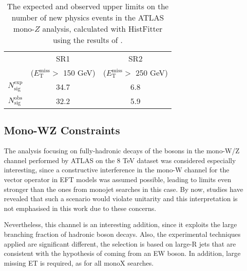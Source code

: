 \begin{table}
\begin{center}
\begin{tabular}{ c  c  c }
\hline
\hline
& SR1 & SR2 \T \\
& ($E_{\mathrm{T}}^{\mathrm{miss}} > $ 150 GeV) & ($E_{\mathrm{T}}^{\mathrm{miss}} > $ 250 GeV) \B \\
\hline
$N_{\mathrm{sig}}^{\mathrm{exp}}$ & 34.7 & 6.8 \T \\
$N_{\mathrm{sig}}^{\mathrm{obs}}$ & 32.2 & 5.9 \B \\
\hline
\hline
\end{tabular}
\end{center}
\label{tab:Nlim_monoZ}
\caption{The expected and observed upper limits on the number of new physics events in the ATLAS mono-$Z$ analysis, calculated with HistFitter using the results of \cite{Aad:2014monoZlep}.}
\end{table}

\subsection{Mono-WZ Constraints}

The analysis focusing on fully-hadronic decays of the bosons in the mono-W/Z channel performed by ATLAS on the 8 TeV dataset was considered especially interesting, since a constructive interference in the mono-W channel for the vector operator in EFT models was assumed possible, leading to limits even stronger than the ones from monojet searches in this case. By now, studies have revealed that such a scenario would violate unitarity and this interpretation is not emphasised in this work due to these concerns.

Nevertheless, this channel is an interesting addition, since it exploits the large branching fraction of hadronic boson decays. Also, the experimental techniques applied are significant different, the selection is based on large-R jets that are consistent with the hypothesis of coming from an EW boson. In addition, large missing ET is required, as for all monoX searches.

